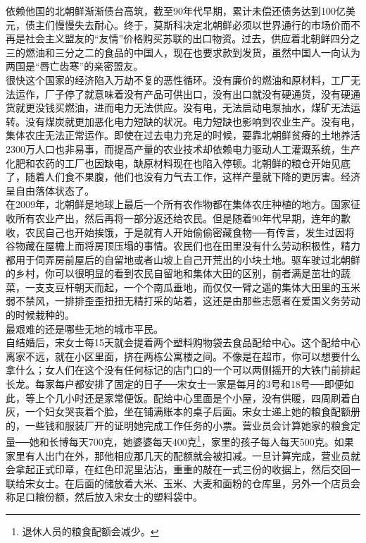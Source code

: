 依赖他国的北朝鲜渐渐债台高筑，截至90年代早期，累计未偿还债务达到100亿美元，债主们慢慢失去耐心。终于，莫斯科决定北朝鲜必须以世界通行的市场价而不再是社会主义盟友的“友情”价格购买苏联的出口物资。过去，供应着北朝鲜四分之三的燃油和三分之二的食品的中国人，现在也要求款到发货，虽然中国人一向认为两国是“唇亡齿寒”的亲密盟友。\\

很快这个国家的经济陷入万劫不复的恶性循环。没有廉价的燃油和原材料，工厂无法运作，厂子停了就意味着没有产品可供出口，没有出口就没有硬通货，没有硬通货就更没钱买燃油，进而电力无法供应。没有电，无法启动电泵抽水，煤矿无法运转。没有煤炭就更加恶化电力短缺的状况。电力短缺也影响到农业生产。没有电，集体农庄无法正常运作。即使在过去电力充足的时候，要靠北朝鲜贫瘠的土地养活2300万人口也非易事，而提高产量的农业技术却依赖电力驱动人工灌溉系统，生产化肥和农药的工厂也因缺电，缺原材料现在也陷入停顿。北朝鲜的粮仓开始见底了，随着人们食不果腹，他们也没有力气去工作，这样产量就下降的更厉害。经济呈自由落体状态了。\\

在2009年，北朝鲜是地球上最后一个所有农作物都在集体农庄种植的地方。国家征收所有农业产出，然后再将一部分返还给农民。但是随着90年代早期，连年的歉收，农民自己也开始挨饿，于是就有人开始偷偷密藏食物──有传言，发生过因将谷物藏在屋檐上而将房顶压塌的事情。农民们也在田里没有什么劳动积极性，精力都用于伺弄房前屋后的自留地或者山坡上自己开荒出的小块土地。驱车驶过北朝鲜的乡村，你可以很明显的看到农民自留地和集体大田的区别，前者满是茁壮的蔬菜，一支支豆杆朝天而起，一个个南瓜垂地，而仅仅一臂之遥的集体大田里的玉米弱不禁风，一排排歪歪扭扭无精打采的站着，这还是由那些志愿者在爱国义务劳动的时候栽种的。\\

最艰难的还是哪些无地的城市平民。\\

自结婚后，宋女士每15天就会提着两个塑料购物袋去食品配给中心。这个配给中心离家不远，就在小区里面，挤在两栋公寓楼之间。不像是在超市，你可以想要什么拿什么；女人们在这个没有任何标记的店门口的一个可以两侧摇开的大铁门前排起长龙。每家每户都安排了固定的日子──宋女士一家是每月的3号和18号──即便如此，等上个几小时还是家常便饭。配给中心里面是个小屋，没有供暖，四周刷着白灰，一个妇女哭丧着个脸，坐在铺满账本的桌子后面。宋女士递上她的粮食配额册的，一些钱和服装厂开的证明她完成工作任务的小票。营业员会计算她家的粮食定量──她和长博每天700克，她婆婆每天400克\footnote{退休人员的粮食配额会减少。}，家里的孩子每人每天500克。如果家里有人出门在外，那他相应那几天的配额就会被扣减。一旦计算完成，营业员就会拿起正式印章，在红色印泥里沾沾，重重的敲在一式三份的收据上，然后交回一联给宋女士。在后面的储放着大米、玉米、大麦和面粉的仓库里，另外一个店员会称足口粮份额，然后放入宋女士的塑料袋中。\\

